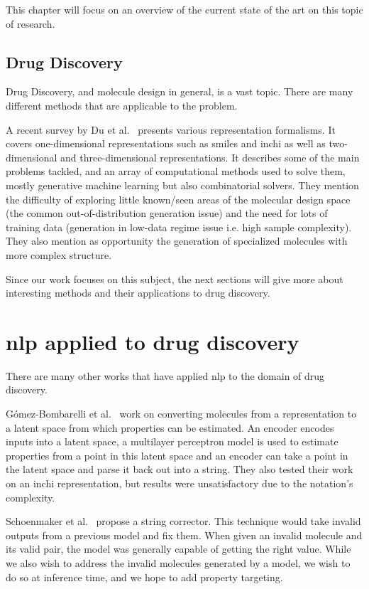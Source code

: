 \documentclass[../Document.tex]{subfiles}
\begin{document}
\label{chap:lit-review}

This chapter will focus on an overview of the current state of the art on this topic of research.

\subsection{Drug Discovery}
Drug Discovery, and molecule design in general, is a vast topic.
There are many different methods that are applicable to the problem.

A recent survey by Du et al.~\cite{du2022molgensurvey} presents various representation formalisms. It covers one-dimensional representations such as \acrshort{smiles} and \acrshort{inchi} as well as two-dimensional and three-dimensional representations.
It describes some of the main problems tackled, and an array of computational methods used to solve them, mostly generative machine learning but also combinatorial solvers.
They mention the difficulty of exploring little known/seen areas of the molecular design space (the common out-of-distribution generation issue) and the need for lots of training data (generation in low-data regime issue i.e. high sample complexity).
They also mention as opportunity the generation of specialized molecules with more complex structure.

Since our work focuses on this subject, the next sections will give more about interesting methods and their applications to drug discovery.


\section{\acrshort{nlp} applied to drug discovery}
\label{sec:lit-review/nlp}
There are many other works that have applied \gls{nlp} to the domain of drug discovery.

Gómez-Bombarelli et al.~\cite{gomez-bombarelli_automatic_2018} work on converting molecules from a \smiles representation to a latent space from which properties can be estimated. An encoder encodes \smiles inputs into a latent space, a multilayer perceptron model is used to estimate properties from a point in this latent space and an encoder can take a point in the latent space and parse it back out into a \smiles string.
They also tested their work on an \gls{inchi} representation, but results were unsatisfactory due to the notation's complexity. 

Schoenmaker et al.~\cite{schoenmaker_uncorrupt_2023} propose a \smiles string corrector. This technique would take invalid outputs from a previous model and fix them. When given an invalid molecule and its valid pair, the model was generally capable of getting the right value. While we also wish to address the invalid molecules generated by a model, we wish to do so at inference time, and we hope to add property targeting.
\end{document}
